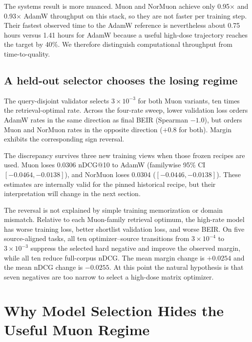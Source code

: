 \documentclass[11pt]{article}
\begin{document}
The systems result is more nuanced. Muon and NorMuon achieve only 0.95$\times$ and 0.93$\times$
AdamW throughput on this stack, so they are not faster per training step. Their fastest observed
time to the AdamW reference is nevertheless about 0.75 hours versus 1.41 hours for AdamW because a
useful high-dose trajectory reaches the target by 40\%. We therefore distinguish computational
throughput from time-to-quality.

\subsection{A held-out selector chooses the losing regime}

The query-disjoint validator selects $3\!\times\!10^{-3}$ for both Muon variants, ten times the
retrieval-optimal rate. Across the four-rate sweep, lower validation loss orders AdamW rates in the
same direction as final BEIR (Spearman $-1.0$), but orders Muon and NorMuon rates in the opposite
direction ($+0.8$ for both). Margin exhibits the corresponding sign reversal.

The discrepancy survives three new training views when those frozen recipes are used. Muon loses
0.0306 nDCG@10 to AdamW (familywise 95\% CI $[-0.0464,-0.0138]$), and NorMuon loses 0.0304
($[-0.0446,-0.0138]$). These estimates are internally valid for the pinned historical recipe, but
their interpretation will change in the next section.

\ConfirmationHeadline



The reversal is not explained by simple training memorization or domain mismatch. Relative to each
Muon-family retrieval optimum, the high-rate model has worse training loss, better shortlist
validation loss, and worse BEIR. On five source-aligned tasks, all ten optimizer--source transitions
from $3\!\times\!10^{-4}$ to $3\!\times\!10^{-3}$ suppress the selected hard negative and improve
the observed margin, while all ten reduce full-corpus nDCG. The mean margin change is $+0.0254$ and
the mean nDCG change is $-0.0255$. At this point the natural hypothesis is that seven negatives are
too narrow to select a high-dose matrix optimizer.

\section{Why Model Selection Hides the Useful Muon Regime}
\label{sec:execution-audit}
\end{document}
